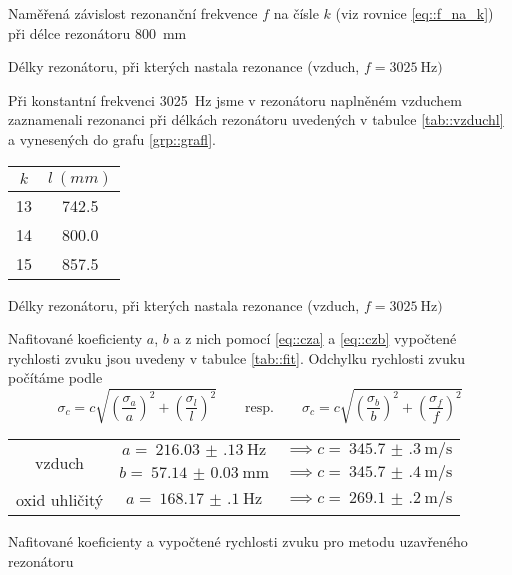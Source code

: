 \begin{graph}[htbp] 
\centering

\caption{Naměřená závislost rezonanční frekvence $f$ na čísle $k$ (viz rovnice \eqref{eq::f_na_k}) při délce rezonátoru \SI{800}{\mm}}
\label{grp::graff}
\end{graph}

\begin{graph}[htbp] 
\centering

\caption{Délky rezonátoru, při kterých nastala rezonance (vzduch, $f=\SI{3025}{\Hz})$ }
\label{grp::grafl}
\end{graph}

Při konstantní frekvenci \SI{3025}{\Hz} jsme v rezonátoru naplněném vzduchem zaznamenali rezonanci při délkách rezonátoru uvedených v tabulce \ref{tab::vzduchl} a vynesených do grafu \ref{grp::grafl}.

\begin{tabulka}[htbp]
\centering
\begin{tabular}{cc}
$k$ & $l~(\si{mm})$ \\ \hline
13 & \num{742.5} \\
14 & \num{800.0} \\
15 & \num{857.5} \\
\end{tabular}
\caption{Délky rezonátoru, při kterých nastala rezonance (vzduch, $f=\SI{3025}{\Hz})$ }
\label{tab::vzduchl}
\end{tabulka}

Nafitované koeficienty $a$, $b$ a z nich pomocí \eqref{eq::cza} a \eqref{eq::czb} vypočtené rychlosti zvuku jsou uvedeny v tabulce \ref{tab::fit}. Odchylku rychlosti zvuku počítáme podle
\begin{equation}
\sigma_c = c \sqrt{ \left( \frac{\sigma_a}{a}   \right)^2
+ \left( \frac{\sigma_l}{l}   \right)^2 } 
\qquad \text{resp.} \qquad 
\sigma_c = c \sqrt{ \left( \frac{\sigma_b}{b}   \right)^2
+ \left( \frac{\sigma_f}{f}   \right)^2 }
\end{equation}


\begin{tabulka}[htbp]
\centering
\begin{tabular}{ccc}
\multirow{2}{*}{vzduch} & $a=~\SI{216.03(13)}{\Hz}$ & $\implies c=~\SI{345.7(3)}{\m\per\s}$ \\
& $b=~\SI{57.14(3)}{\mm}$ & $\implies c=~\SI{345.7(4)}{\m\per\s}$ \\ \hline
oxid uhličitý & $a=~\SI{168.17(10)}{\Hz}$ & $\implies c=~\SI{269.1(2)}{\m\per\s}$ \\
\end{tabular}
\caption{Nafitované koeficienty a vypočtené rychlosti zvuku pro metodu uzavřeného rezonátoru}
\label{tab::fit}
\end{tabulka}

